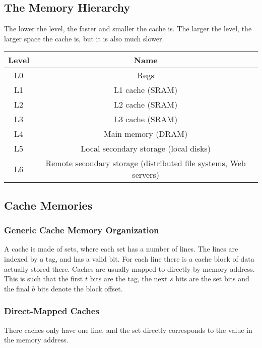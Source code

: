 \documentclass[10pt]{armath}
\begin{document}
\subsection{The Memory Hierarchy}%
\label{sub:the_memory_hierarchy}

The lower the level, the faster and smaller the cache is. The larger the level,
the larger space the cache is, but it is also much slower.

\begin{center}
  \begin{tabular}{c c}
  Level & Name\\\hline
  L0 & Regs\\
  L1 & L1 cache (SRAM)\\
  L2 & L2 cache (SRAM)\\
  L3 & L3 cache (SRAM)\\
  L4 & Main memory (DRAM)\\
  L5 & Local secondary storage (local disks)\\
  L6 & Remote secondary storage (distributed file systems, Web servers)\\\hline
  \end{tabular}
\end{center}

\subsection{Cache Memories}%
\label{sub:cache_memories}

\subsubsection{Generic Cache Memory Organization}%
\label{ssub:generic_cache_memory_organization}

A cache is made of sets, where each set has a number of lines. The lines are
indexed by a tag, and has a valid bit. For each line there is a cache block of
data actually stored there. Caches are usually mapped to directly by memory
address. This is such that the first $t$ bits are the tag, the next $s$ bits
are the set bits and the final $b$ bits denote the block offset.

\subsubsection{Direct-Mapped Caches}%
\label{ssub:direct_mapped_caches}

There caches only have one line, and the set directly corresponds to the value
in the memory address.
\end{document}
